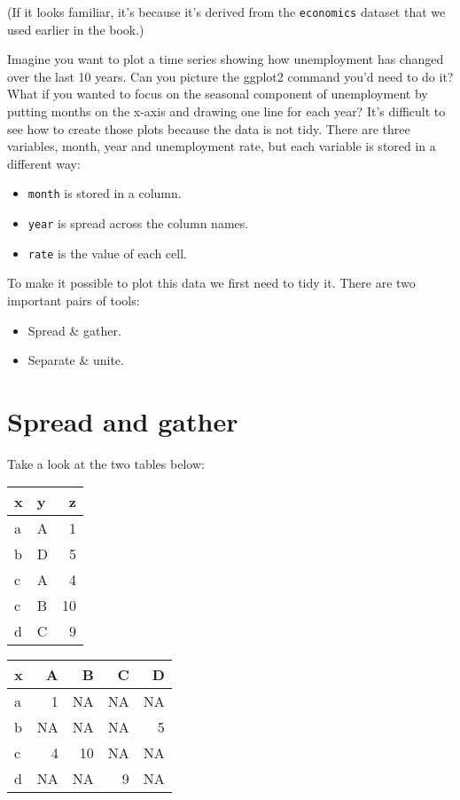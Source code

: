 (If it looks familiar, it's because it's derived from the
\texttt{economics} dataset that we used earlier in the book.)

Imagine you want to plot a time series showing how unemployment has
changed over the last 10 years. Can you picture the ggplot2 command
you'd need to do it? What if you wanted to focus on the seasonal
component of unemployment by putting months on the x-axis and drawing
one line for each year? It's difficult to see how to create those plots
because the data is not tidy. There are three variables, month, year and
unemployment rate, but each variable is stored in a different way:

\begin{itemize}
\tightlist
\item
  \texttt{month} is stored in a column.
\item
  \texttt{year} is spread across the column names.
\item
  \texttt{rate} is the value of each cell.
\end{itemize}

To make it possible to plot this data we first need to tidy it. There
are two important pairs of tools:

\begin{itemize}
\tightlist
\item
  Spread \& gather.
\item
  Separate \& unite.
\end{itemize}

\hypertarget{sec:spread-gather}{%
\section{Spread and gather}\label{sec:spread-gather}}

Take a look at the two tables below:

\begin{longtable}[]{@{}llr@{}}
\toprule
x & y & z\tabularnewline
\midrule
\endhead
a & A & 1\tabularnewline
b & D & 5\tabularnewline
c & A & 4\tabularnewline
c & B & 10\tabularnewline
d & C & 9\tabularnewline
\bottomrule
\end{longtable}

\begin{longtable}[]{@{}lrrrr@{}}
\toprule
x & A & B & C & D\tabularnewline
\midrule
\endhead
a & 1 & NA & NA & NA\tabularnewline
b & NA & NA & NA & 5\tabularnewline
c & 4 & 10 & NA & NA\tabularnewline
d & NA & NA & 9 & NA\tabularnewline
\bottomrule
\end{longtable}

